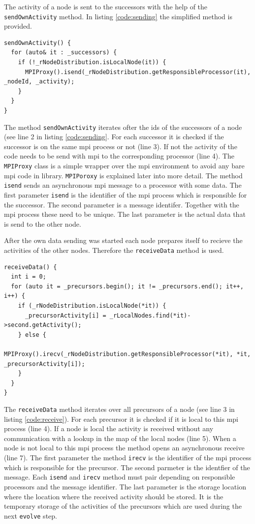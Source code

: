 \documentclass[12pt]{article}
\begin{document}
The activity of a node is sent to the successors with the help of the  \texttt{sendOwnActivity} method.
In listing \ref{code:sending} the simplified method is provided.
\begin{lstlisting}[caption=The simplified \texttt{sendOwnActivity} method of the nodes.,label=code:sending]
sendOwnActivity() {
  for (auto& it : _successors) {
	if (!_rNodeDistribution.isLocalNode(it)) {
	  MPIProxy().isend(_rNodeDistribution.getResponsibleProcessor(it), _nodeId, _activity);
	}
  }
}
\end{lstlisting}
The method  \texttt{sendOwnActivity}  iterates ofter the ids of the successors of a node (see line 2 in listing \ref{code:sending}.
For each successor it is checked if the successor is on the same mpi process or not (line 3).
If not the activity of the code needs to be send with mpi to the corresponding processor (line 4).
The \texttt{MPIProxy} class is a simple wrapper over the mpi environment to avoid any bare mpi code in library.
\texttt{MPIPoroxy} is explained later into more detail.
The method \texttt{isend} sends an asynchronous mpi message to a processor with some data.
The first parameter \texttt{isend} is the identifier of the mpi process which is responsible for the successor.
The second parameter is a message identifer.
Together with the mpi process these need to be unique.
The last parameter is the actual data that is send to the other node.

After the own data sending was started each node prepares itself to recieve the activities of the other nodes.
Therefore the \texttt{receiveData} method is used.

\begin{lstlisting}[caption=The simplified \texttt{receiveData} method of the nodes.,label=code:receive]
receiveData() {
  int i = 0;
  for (auto it = _precursors.begin(); it != _precursors.end(); it++, i++) {
	if (_rNodeDistribution.isLocalNode(*it)) {
  	  _precursorActivity[i] = _rLocalNodes.find(*it)->second.getActivity();
	} else {
	  MPIProxy().irecv(_rNodeDistribution.getResponsibleProcessor(*it), *it, _precursorActivity[i]);
	}
  }
}
\end{lstlisting}

The \texttt{receiveData} method iterates over all precursors of a node (see line 3 in listing \ref{code:receive}).
For each precursor it is checked if it is local to this mpi process (line 4).
If a node is local the activity is received without any communication with a lookup in the map of the local nodes (line 5).
When a node is not local to this mpi process the method opens an asynchronous receive (line 7).
The first parameter the method \texttt{irecv} is the identifier of the mpi process which is responsible for the precursor.
The second parmeter is the identfier of the message. 
Each \texttt{isend} and \texttt{irecv} method must pair depending on responsible processors and the message identifier.
The last parameter is the storage location where the location where the received activity should be stored.
It is the temporary storage of the activities of the precursors which are used during the next \texttt{evolve} step.
\end{document}
